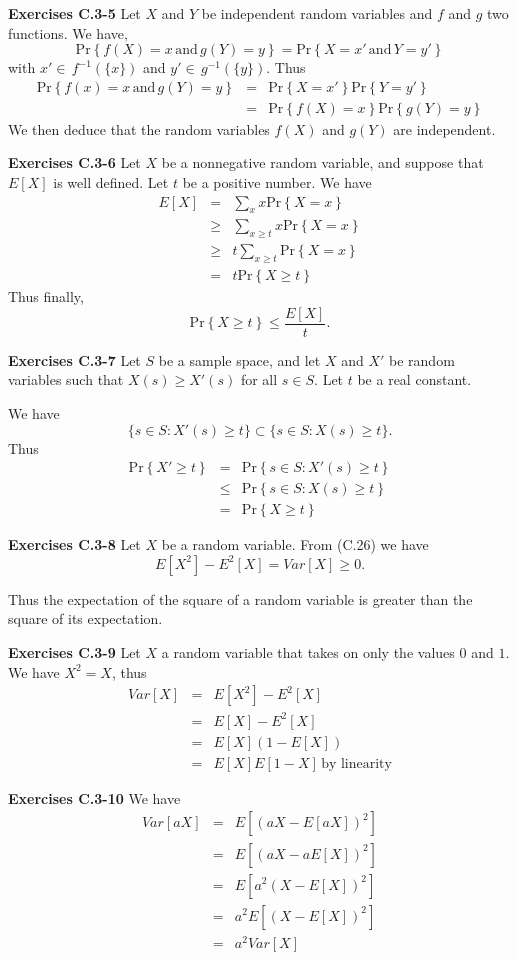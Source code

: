 \documentclass[a4paper,12pt]{article}
\newcommand{\newpar}[1]
{\bigskip \noindent \textbf{Exercises #1} \newline}
\newcommand{\prob}[1]{\mathrm{Pr}\left\{ #1 \right\}}
\begin{document}
\newpar{C.3-5}
Let $X$ and $Y$ be independent random variables and $f$ and $g$ two
functions.   We have,
\[  \prob{f(X) = x\,\mbox{and}\,g(Y) = y} =
\prob{X = x'\,\mbox{and}\,Y = y'}\]
with $x' \in\, f^{-1}\left(\{x\}\right)$ and $y' \in\,
g^{-1}\left(\{y\}\right)$.  Thus
\begin{eqnarray*}
  \prob{f(x) = x \,\mbox{and}\,g(Y) = y} &=&
  \prob{X = x'} \prob{Y = y'}  \\
  &=& \prob{f(X) = x} \prob{g(Y) = y}
\end{eqnarray*}
We then deduce that the random variables $f(X)$ and $g(Y)$ are
independent.

\newpar{C.3-6}
Let $X$ be a nonnegative random variable, and suppose that $E[X]$ is
well defined.  Let $t$ be a positive number.  We have
\begin{eqnarray*}
  E[X] &=& \sum_x x \prob{X=x} \\
  &\ge& \sum_{x \ge t} x \prob{X=x} \\
  &\ge& t \sum_{x \ge t} \prob{X=x} \\
  &=& t \prob{X \ge t}
\end{eqnarray*}
Thus finally,
\[ \prob{X \ge t} \le \frac{E[X]}{t}.\]

\newpar{C.3-7}
Let $S$ be a sample space, and let $X$ and $X'$ be random variables
such that $X(s) \ge X'(s)$ for all $s \in S$.   Let $t$ be a real
constant.

We have
\[ \{ s \in S: X'(s) \ge t \} \subset \{ s \in S: X(s) \ge t \}.\]
Thus
\begin{eqnarray*}
  \prob{X' \ge t} &=& \prob{s \in S: X'(s) \ge t} \\
  &\le& \prob{s \in S: X(s) \ge t} \\
  &=& \prob{X \ge t}
\end{eqnarray*}

\newpar{C.3-8}
Let $X$ be a random variable.  From (C.26) we have
\[ E[X^2] - E^2[X] = Var[X] \ge 0.\]

Thus the expectation of the square of a random variable is greater
than the square of its expectation.

\newpar{C.3-9}
Let $X$ a random variable that takes on only the values $0$ and $1$.
We have $X^2 = X$, thus
\begin{eqnarray*}
  Var[X] &=& E[X^2] - E^2[X] \\
  &=& E[X] - E^2[X] \\
  &=& E[X](1 - E[X]) \\
  &=& E[X] E[1-X]\,\mbox{by linearity}
\end{eqnarray*}

\newpar{C.3-10}
We have
\begin{eqnarray*}
  Var[a X] &=& E[(aX - E[aX])^2] \\
  &=& E[(aX - aE[X])^2] \\
  &=& E[a^2(X-E[X])^2] \\
  &=& a^2 E[(X-E[X])^2] \\
  &=& a^2 Var[X]
\end{eqnarray*}
\end{document}
